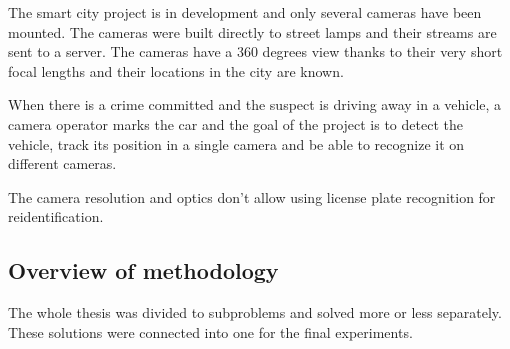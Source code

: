 \documentclass[a4paper,11pt,titlepage,twoside]{article}
\numberwithin{figure}{section}
\begin{document}
The smart city project is in development and only several cameras have been mounted. The cameras were built directly to street lamps and their streams are sent to a server. The cameras have a 360 degrees view thanks to their very short focal lengths and their locations in the city are known.

When there is a crime committed and the suspect is driving away in a vehicle, a camera operator marks the car and the goal of the project is to detect the vehicle, track its position in a single camera and be able to recognize it on different cameras. 

The camera resolution and optics don't allow using license plate recognition for reidentification.

\subsection{Overview of methodology}

The whole thesis was divided to subproblems and solved more or less separately. These solutions were connected into one for the final experiments.
\end{document}
